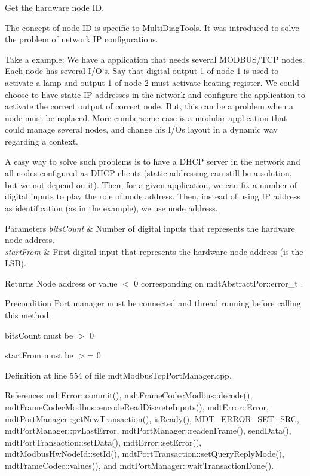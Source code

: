 Get the hardware node I\-D. 

The concept of node I\-D is specific to Multi\-Diag\-Tools. It was introduced to solve the problem of network I\-P configurations.

Take a example\-: We have a application that needs several M\-O\-D\-B\-U\-S/\-T\-C\-P nodes. Each node has several I/\-O's. Say that digital output 1 of node 1 is used to activate a lamp and output 1 of node 2 must activate heating register. We could choose to have static I\-P addresses in the network and configure the application to activate the correct output of correct node. But, this can be a problem when a node must be replaced. More cumbersome case is a modular application that could manage several nodes, and change his I/\-Os layout in a dynamic way regarding a context.

A easy way to solve such problems is to have a D\-H\-C\-P server in the network and all nodes configured as D\-H\-C\-P clients (static addressing can still be a solution, but we not depend on it). Then, for a given application, we can fix a number of digital inputs to play the role of node address. Then, instead of using I\-P address as identification (as in the example), we use node address.


\begin{DoxyParams}{Parameters}
{\em bits\-Count} & Number of digital inputs that represents the hardware node address. \\
\hline
{\em start\-From} & First digital input that represents the hardware node address (is the L\-S\-B). \\
\hline
\end{DoxyParams}
\begin{DoxyReturn}{Returns}
Node address or value $<$ 0 corresponding on mdt\-Abstract\-Por\-::error\-\_\-t . 
\end{DoxyReturn}
\begin{DoxyPrecond}{Precondition}
Port manager must be connected and thread running before calling this method. 

bits\-Count must be $>$ 0 

start\-From must be $>$= 0 
\end{DoxyPrecond}


Definition at line 554 of file mdt\-Modbus\-Tcp\-Port\-Manager.\-cpp.



References mdt\-Error\-::commit(), mdt\-Frame\-Codec\-Modbus\-::decode(), mdt\-Frame\-Codec\-Modbus\-::encode\-Read\-Discrete\-Inputs(), mdt\-Error\-::\-Error, mdt\-Port\-Manager\-::get\-New\-Transaction(), is\-Ready(), M\-D\-T\-\_\-\-E\-R\-R\-O\-R\-\_\-\-S\-E\-T\-\_\-\-S\-R\-C, mdt\-Port\-Manager\-::pv\-Last\-Error, mdt\-Port\-Manager\-::readen\-Frame(), send\-Data(), mdt\-Port\-Transaction\-::set\-Data(), mdt\-Error\-::set\-Error(), mdt\-Modbus\-Hw\-Node\-Id\-::set\-Id(), mdt\-Port\-Transaction\-::set\-Query\-Reply\-Mode(), mdt\-Frame\-Codec\-::values(), and mdt\-Port\-Manager\-::wait\-Transaction\-Done().



